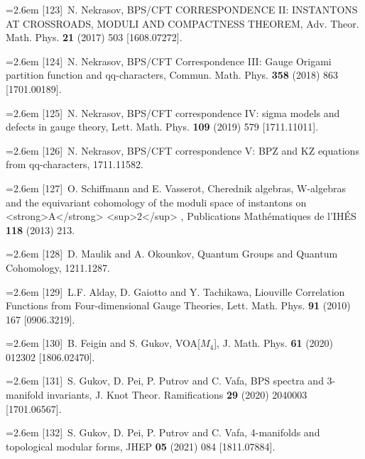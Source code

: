 \par\noindent\hangindent=2.6em [123]~N. Nekrasov, BPS/CFT CORRESPONDENCE II: INSTANTONS AT CROSSROADS, MODULI AND COMPACTNESS THEOREM, Adv. Theor. Math. Phys. \textbf{21} (2017) 503 [1608.07272].

\par\noindent\hangindent=2.6em [124]~N. Nekrasov, BPS/CFT Correspondence III: Gauge Origami partition function and qq-characters, Commun. Math. Phys. \textbf{358} (2018) 863 [1701.00189].

\par\noindent\hangindent=2.6em [125]~N. Nekrasov, BPS/CFT correspondence IV: sigma models and defects in gauge theory, Lett. Math. Phys. \textbf{109} (2019) 579 [1711.11011].

\par\noindent\hangindent=2.6em [126]~N. Nekrasov, BPS/CFT correspondence V: BPZ and KZ equations from qq-characters, 1711.11582.

\par\noindent\hangindent=2.6em [127]~O. Schiffmann and E. Vasserot, Cherednik algebras, W-algebras and the equivariant cohomology of the moduli space of instantons on <strong>A</strong> <sup>2</sup> , Publications Mathématiques de l'IHÉS \textbf{118} (2013) 213.

\par\noindent\hangindent=2.6em [128]~D. Maulik and A. Okounkov, Quantum Groups and Quantum Cohomology, 1211.1287.

\par\noindent\hangindent=2.6em [129]~L.F. Alday, D. Gaiotto and Y. Tachikawa, Liouville Correlation Functions from Four-dimensional Gauge Theories, Lett. Math. Phys. \textbf{91} (2010) 167 [0906.3219].

\par\noindent\hangindent=2.6em [130]~B. Feigin and S. Gukov, VOA[$M_4$], J. Math. Phys. \textbf{61} (2020) 012302 [1806.02470].

\par\noindent\hangindent=2.6em [131]~S. Gukov, D. Pei, P. Putrov and C. Vafa, BPS spectra and 3-manifold invariants, J. Knot Theor. Ramifications \textbf{29} (2020) 2040003 [1701.06567].

\par\noindent\hangindent=2.6em [132]~S. Gukov, D. Pei, P. Putrov and C. Vafa, 4-manifolds and topological modular forms, JHEP \textbf{05} (2021) 084 [1811.07884].

